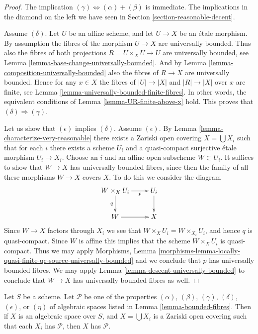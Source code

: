 \begin{proof}
The implication $(\gamma) \Leftrightarrow (\alpha) + (\beta)$ is immediate.
The implications in the diamond on the left we have seen in
Section \ref{section-reasonable-decent}.

\medskip\noindent
Assume $(\delta)$. Let $U$ be an affine scheme, and let $U \to X$ be an \'etale
morphism. By assumption the fibres of the morphism $U \to X$ are universally
bounded. Thus also the fibres of both projections $R = U \times_X U \to U$
are universally bounded, see
Lemma \ref{lemma-base-change-universally-bounded}.
And by
Lemma \ref{lemma-composition-universally-bounded}
also the fibres of $R \to X$ are universally bounded.
Hence for any $x \in X$ the fibres of $|U| \to |X|$ and $|R| \to |X|$
over $x$ are finite, see
Lemma \ref{lemma-universally-bounded-finite-fibres}.
In other words, the equivalent conditions of
Lemma \ref{lemma-UR-finite-above-x}
hold. This proves that $(\delta) \Rightarrow (\gamma)$.

\medskip\noindent
Let us show that $(\epsilon)$ implies $(\delta)$.
Assume $(\epsilon)$. By
Lemma \ref{lemma-characterize-very-reasonable}
there exists
a Zariski open covering $X = \bigcup X_i$ such that for each $i$
there exists a scheme $U_i$ and a quasi-compact surjective \'etale morphism
$U_i \to X_i$. Choose an $i$ and an affine open subscheme $W \subset U_i$.
It suffices to show that $W \to X$ has universally bounded fibres, since then
the family of all these morphisms $W \to X$ covers $X$.
To do this we consider the diagram
$$
\xymatrix{
W \times_X U_i \ar[r]_-p \ar[d]_q & U_i \ar[d] \\
W \ar[r] & X
}
$$
Since $W \to X$ factors through $X_i$ we see that
$W \times_X U_i = W \times_{X_i} U_i$, and hence $q$ is quasi-compact.
Since $W$ is affine this implies that the scheme $W \times_X U_i$
is quasi-compact. Thus we may apply
Morphisms, Lemma
\ref{morphisms-lemma-locally-quasi-finite-qc-source-universally-bounded}
and we conclude that $p$ has universally bounded fibres.
We may apply
Lemma \ref{lemma-descent-universally-bounded}
to conclude that $W \to X$ has universally bounded fibres as well.
\end{proof}

\begin{lemma}
\label{lemma-properties-local}
Let $S$ be a scheme.
Let $\mathcal{P}$ be one of the properties
$(\alpha)$, $(\beta)$, $(\gamma)$, $(\delta)$, $(\epsilon)$, or
$(\eta)$ of algebraic spaces
listed in Lemma \ref{lemma-bounded-fibres}.
Then if $X$ is an algebraic space over $S$, and $X = \bigcup X_i$ is a
Zariski open covering such that each $X_i$ has $\mathcal{P}$,
then $X$ has $\mathcal{P}$.
\end{lemma}


